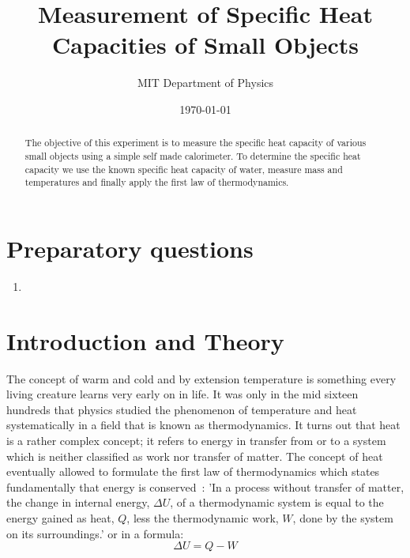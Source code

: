 \documentclass[10pt,aps,twocolumn,secnumarabic,balancelastpage,amsmath,amssymb,nofootinbib,floatfix]{revtex4}
\begin{document}
\title{Measurement of Specific Heat Capacities of Small Objects}
\author{MIT Department of Physics}
\date{\today}

\begin{abstract}
  The objective of this experiment is to measure the specific heat capacity of various small objects using a simple self made calorimeter.  To determine the specific heat capacity we use the known specific heat capacity of water, measure mass and temperatures and finally apply the first law of thermodynamics.
\end{abstract}

\maketitle

\section*{Preparatory questions}

\begin{enumerate}
\item
\end{enumerate}

\section{Introduction and Theory}

The concept of warm and cold and by extension temperature is something every living creature learns very early on in life. It was only in the mid sixteen hundreds that physics studied the phenomenon of temperature and heat systematically in a field that is known as thermodynamics. It turns out that heat is a rather complex concept; it refers to energy in transfer from or to a system
which is neither classified as work nor transfer of matter. The concept of heat eventually allowed to formulate the first law of thermodynamics which states fundamentally that energy is conserved~\cite{BailynThermo}: 'In a process without transfer of matter, the change in internal energy, $\Delta U$, of a thermodynamic system is equal to the energy gained as heat, $Q$, less the thermodynamic work, $W$, done by the system on its surroundings.' or in a formula:
$$
\Delta U = Q - W
$$
\end{document}
